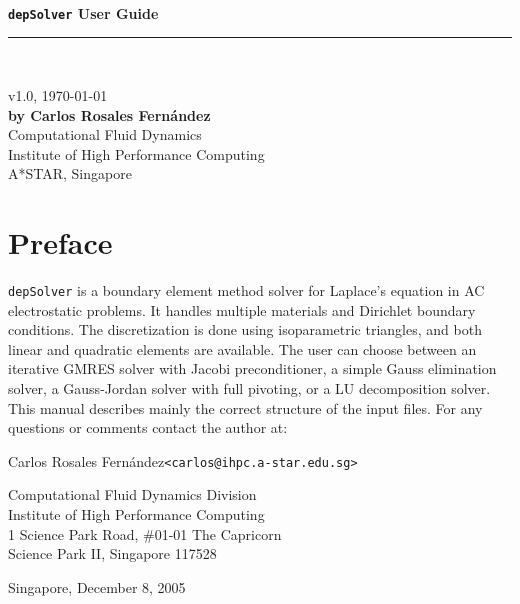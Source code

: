 \documentclass[12pt]{article}
\begin{document}
\begin{titlepage}
\verb+      +
\vspace{3cm}
\begin{flushright}
{\huge\bf\verb+depSolver+ User Guide}
\rule{150mm}{6pt}\\
\begin{large} v1.0, \today\\
\vspace{7cm}
{\bf by Carlos Rosales Fern\'andez}\\
Computational Fluid Dynamics\\
Institute of High Performance Computing\\
A*STAR, Singapore
\end{large}
\end{flushright}
\end{titlepage}
\pagebreak

\section*{Preface}\noindent \verb+depSolver+ is a boundary element method solver for Laplace's equation in AC electrostatic problems. It handles multiple materials and Dirichlet boundary conditions. The discretization is done using isoparametric triangles, and both linear and quadratic elements are available. The user can choose between an iterative GMRES solver with Jacobi preconditioner, a simple Gauss elimination solver, a Gauss-Jordan solver with full pivoting, or a LU decomposition solver. This manual describes mainly the correct structure of the input files. For any questions or comments contact the author at:\par\vspace{2em}

	Carlos Rosales Fern\'andez\hspace{1cm}\verb+<carlos@ihpc.a-star.edu.sg>+\par\vspace{1em}
	
	Computational Fluid Dynamics Division\\
	Institute of High Performance Computing\\
	1 Science Park Road, \#01-01 The Capricorn\\
	Science Park II, Singapore 117528

	\begin{flushright}Singapore, December 8, 2005\end{flushright}
\pagebreak
\end{document}
